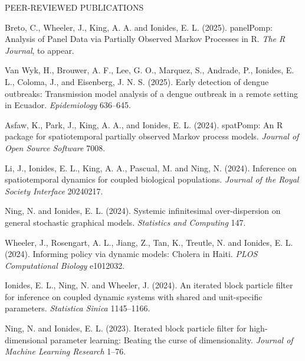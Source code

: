 \begin{reflist}{PEER-REVIEWED PUBLICATIONS}

\item Breto, C., Wheeler, J., King, A. A. and Ionides, E. L. (2025). panelPomp: Analysis of Panel Data via Partially Observed Markov Processes in R. {\it The R Journal}, to appear.

\item Van Wyk, H.,  Brouwer, A. F.,  Lee, G. O., Marquez, S., Andrade, P.,  Ionides, E. L., Coloma, J., and Eisenberg, J. N. S. (2025). Early detection of dengue outbreaks: Transmission model analysis of a dengue outbreak in a remote setting in Ecuador. {\it Epidemiology} {}{\separator}636--645.

\item Asfaw, K., Park, J., King, A. A., and Ionides, E. L. (2024). spatPomp: An R package for spatiotemporal partially observed Markov process models. {\it Journal of Open Source Software} {}{\separator}7008.
  
\item Li, J., Ionides, E. L., King, A. A., Pascual, M. and Ning, N. (2024). Inference on spatiotemporal dynamics for coupled biological populations. {\it Journal of the Royal Society Interface} {}{\separator}20240217.
  
\item Ning, N. and Ionides, E. L. (2024). Systemic infinitesimal over-dispersion on general stochastic graphical models. {\it Statistics and Computing} {}{\separator}147.

\item Wheeler, J., Rosengart, A. L., Jiang, Z., Tan, K., Treutle, 
  N. and Ionides, E. L. (2024). Informing policy via dynamic models: Cholera in Haiti. {\it PLOS Computational Biology} {}{\separator}e1012032.

\item Ionides, E. L., Ning, N. and Wheeler, J. (2024). An iterated block particle filter for inference on coupled dynamic systems with shared and unit-specific parameters. {\it Statistica Sinica} {}{\separator}1145--1166.

  \item Ning, N. and Ionides, E. L. (2023). Iterated block particle filter for high-dimensional parameter learning: Beating the curse of dimensionality. {\it Journal of Machine Learning Research} {}{\separator}1--76.


\end{reflist}
